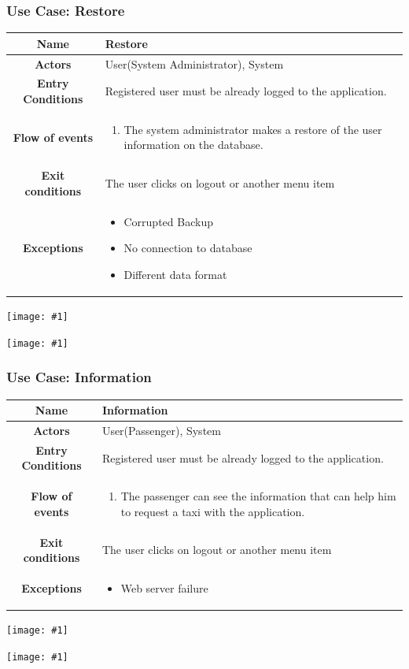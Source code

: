 \documentclass[11pt, a4paper,titlepage]{article}
\newcommand{\image}[1]{
	\begin{center}
		\noindent \texttt{[image: \#1]}
	\end{center}
	}
\begin{document}
\subsubsection{Use Case: Restore}
		\begin{tabularx}{\textwidth}{| c | X |}
			\hline
			\textbf{Name} & 
			Restore
			\\
			\hline
			\textbf{Actors} & 
			User(System Administrator), System 
			\\
			\hline
			\textbf{Entry Conditions} &
			Registered user must be already logged to the application. 
			\\
			\hline
			\textbf{Flow of events} & 
			\begin{enumerate}
				\item The system administrator makes a restore of the user information on the database.
			\end{enumerate}						
			\\
			\hline
			\textbf{Exit conditions} & 
			The user clicks on logout or another menu item
			\\
			\hline
			\textbf{Exceptions} & 
			\begin{itemize}
				\item Corrupted Backup
				\item No connection to database
				\item Different data format
			\end{itemize} 
			\\
			\hline		
		\end{tabularx}
		\image{usecase_restore.png}
		\image{diagram_sequence_restore.png}
		\newpage
\subsubsection{Use Case: Information}
		\begin{tabularx}{\textwidth}{| c | X |}
			\hline
			\textbf{Name} & 
			Information
			\\
			\hline
			\textbf{Actors} & 
			User(Passenger), System 
			\\
			\hline
			\textbf{Entry Conditions} &
			Registered user must be already logged to the application. 
			\\
			\hline
			\textbf{Flow of events} & 
			\begin{enumerate}
				\item The passenger can see the information that can help him to request a taxi with  the application.
			\end{enumerate}						
			\\
			\hline
			\textbf{Exit conditions} & 
			The user clicks on logout or another menu item
			\\
			\hline
			\textbf{Exceptions} & 
			\begin{itemize}
				\item Web server failure
			\end{itemize} 
			\\
			\hline		
		\end{tabularx}
		\image{usecase_information.png}
		\image{diagram_sequence_information.png}
		\newpage
\end{document}
